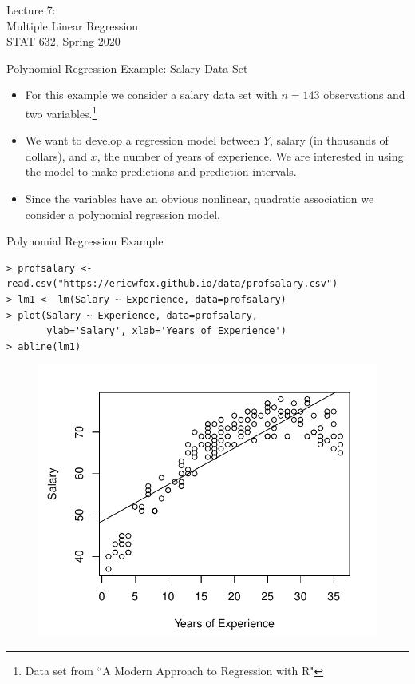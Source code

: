 \documentclass[10pt]{beamer}
\begin{document}
\begin{frame}
\large
Lecture 7:\\ 
Multiple Linear Regression\\
STAT 632, Spring 2020\\
\end{frame}

\begin{frame}{Polynomial Regression Example: Salary Data Set}
\begin{itemize}
\item For this example we consider a salary data set with $n=143$ observations and two variables.\footnote{\small Data set from ``A Modern Approach to Regression with R"}
\vspace{10pt}
\item We want to develop a regression model between $Y$, salary (in thousands of dollars), and $x$, the number of years of experience.  We are interested in using the model to make predictions and prediction intervals.
\vspace{10pt}
\item Since the variables have an obvious nonlinear, quadratic association we consider a polynomial regression model.
\end{itemize}
\end{frame}

\begin{frame}[fragile]{Polynomial Regression Example}
\scriptsize
\begin{verbatim}
> profsalary <- read.csv("https://ericwfox.github.io/data/profsalary.csv")
> lm1 <- lm(Salary ~ Experience, data=profsalary)
> plot(Salary ~ Experience, data=profsalary, 
       ylab='Salary', xlab='Years of Experience')
> abline(lm1)
\end{verbatim}
\begin{figure}
\includegraphics[scale=0.5]{figure/salary_plot1.pdf}
\end{figure}
\end{frame}
\end{document}
